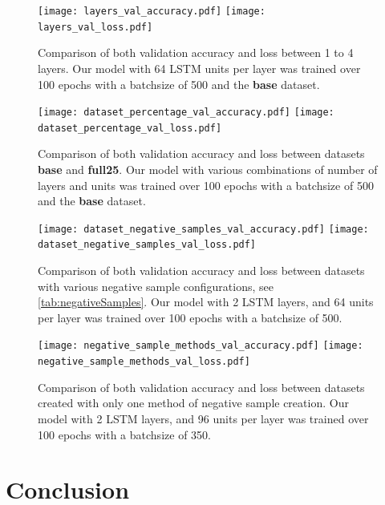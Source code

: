 \documentclass[
	ngerman,
	ruledheaders=section,%
	class=report,%
	thesis={type=bachelor},%
	accentcolor=9c,%
	custommargins=true,%
	marginpar=false,%
	parskip=half-,%
	fontsize=11pt,%
]{tudapub}
\begin{document}
\begin{figure}
    \texttt{[image: layers\_val\_accuracy.pdf]}
    \texttt{[image: layers\_val\_loss.pdf]}
    \caption{Comparison of both validation accuracy and loss between 1 to 4 layers.
    Our model with 64 LSTM units per layer was trained over 100 epochs with a batchsize of 500 and the \textbf{base} dataset.}
    \label{fig:layers}
\end{figure}

\begin{figure}
    \texttt{[image: dataset\_percentage\_val\_accuracy.pdf]}
    \texttt{[image: dataset\_percentage\_val\_loss.pdf]}
    \caption{Comparison of both validation accuracy and loss between datasets \textbf{base} and \textbf{full25}.
    Our model with various combinations of number of layers and units was trained over 100 epochs with a batchsize of 500 and the \textbf{base} dataset.}
    \label{fig:dataset_percentage}
\end{figure}

\begin{figure}
    \texttt{[image: dataset\_negative\_samples\_val\_accuracy.pdf]}
    \texttt{[image: dataset\_negative\_samples\_val\_loss.pdf]}
    \caption{Comparison of both validation accuracy and loss between datasets with various negative sample configurations, see \ref{tab:negativeSamples}.
    Our model with 2 LSTM layers, and 64 units per layer was trained over 100 epochs with a batchsize of 500.}
    \label{fig:dataset_negative}
\end{figure}

\begin{figure}
    \texttt{[image: negative\_sample\_methods\_val\_accuracy.pdf]}
    \texttt{[image: negative\_sample\_methods\_val\_loss.pdf]}
    \caption{Comparison of both validation accuracy and loss between datasets created with only one method of negative sample creation.
    Our model with 2 LSTM layers, and 96 units per layer was trained over 100 epochs with a batchsize of 350.}
    \label{fig:negative_methods}
\end{figure}


\chapter{Conclusion}
\label{sec:conclusion}
\end{document}
